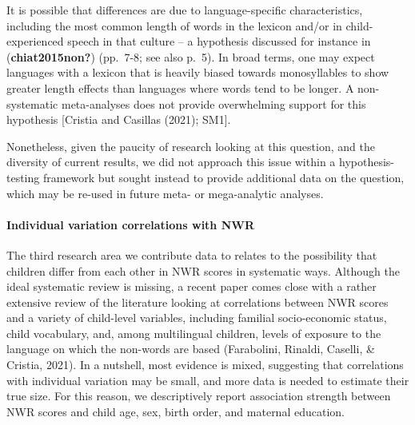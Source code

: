 \documentclass[
  english,
  ,man,floatsintext]{apa6}
\let\oldparagraph\paragraph
\renewcommand{\paragraph}[1]{\oldparagraph{#1}\mbox{}}
\begin{document}
It is possible that differences are due to language-specific characteristics, including the most common length of words in the lexicon and/or in child-experienced speech in that culture -- a hypothesis discussed for instance in (\textbf{chiat2015non?}) (pp.~7-8; see also p.~5). In broad terms, one may expect languages with a lexicon that is heavily biased towards monosyllables to show greater length effects than languages where words tend to be longer. A non-systematic meta-analyses does not provide overwhelming support for this hypothesis {[}Cristia and Casillas (2021); SM1{]}.

Nonetheless, given the paucity of research looking at this question, and the diversity of current results, we did not approach this issue within a hypothesis-testing framework but sought instead to provide additional data on the question, which may be re-used in future meta- or mega-analytic analyses.

\hypertarget{individual-variation-correlations-with-nwr}{%
\paragraph{Individual variation correlations with NWR}\label{individual-variation-correlations-with-nwr}}

The third research area we contribute data to relates to the possibility that children differ from each other in NWR scores in systematic ways. Although the ideal systematic review is missing, a recent paper comes close with a rather extensive review of the literature looking at correlations between NWR scores and a variety of child-level variables, including familial socio-economic status, child vocabulary, and, among multilingual children, levels of exposure to the language on which the non-words are based (Farabolini, Rinaldi, Caselli, \& Cristia, 2021). In a nutshell, most evidence is mixed, suggesting that correlations with individual variation may be small, and more data is needed to estimate their true size. For this reason, we descriptively report association strength between NWR scores and child age, sex, birth order, and maternal education.
\end{document}
